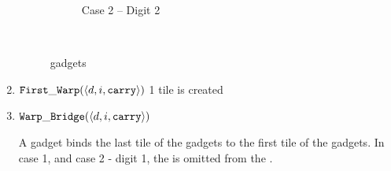 \begin{enumerate}[label={--}]
\begin{figure}[H]
\begin{subfigure}[t]{0.2\textwidth}
                        \caption{\label{fig:warping/pre_warp_case2_digit2_msr} Case 2 -- Digit 2}
                    \end{subfigure}%
                    ~
                    \caption{\label{fig:pre_warp_gadgets} {\prewarp} gadgets }
                \end{figure}


            \item ${\tt First\_Warp} (\langle d, i, {\tt carry}\rangle)$
                1 tile is created

            \item ${\tt Warp\_Bridge}(\langle d, i, {\tt carry}\rangle)$

                A {\warpbridge} gadget binds the last tile of the {\firstwarp} gadgets to the
                first tile of the {\secondwarp} gadgets. In case 1, and case 2 - digit 1, the
                {\warpbridge} is omitted from the {\warpunit}.


\end{enumerate}
